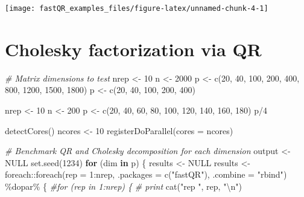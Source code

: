 \documentclass[]{tufte-handout}
\newenvironment{Shaded}{}{}
\newcommand{\AttributeTok}[1]{\textcolor[rgb]{0.49,0.56,0.16}{#1}}
\newcommand{\CommentTok}[1]{\textcolor[rgb]{0.38,0.63,0.69}{\textit{#1}}}
\newcommand{\ConstantTok}[1]{\textcolor[rgb]{0.53,0.00,0.00}{#1}}
\newcommand{\ControlFlowTok}[1]{\textcolor[rgb]{0.00,0.44,0.13}{\textbf{#1}}}
\newcommand{\DecValTok}[1]{\textcolor[rgb]{0.25,0.63,0.44}{#1}}
\newcommand{\FunctionTok}[1]{\textcolor[rgb]{0.02,0.16,0.49}{#1}}
\newcommand{\NormalTok}[1]{#1}
\newcommand{\OtherTok}[1]{\textcolor[rgb]{0.00,0.44,0.13}{#1}}
\newcommand{\SpecialCharTok}[1]{\textcolor[rgb]{0.25,0.44,0.63}{#1}}
\newcommand{\StringTok}[1]{\textcolor[rgb]{0.25,0.44,0.63}{#1}}
\begin{document}
\texttt{[image: fastQR\_examples\_files/figure-latex/unnamed-chunk-4-1]}

\hypertarget{cholesky-factorization-via-qr}{%
\section{Cholesky factorization via
QR}\label{cholesky-factorization-via-qr}}

\begin{Shaded}
\begin{Highlighting}[]
\CommentTok{\# Matrix dimensions to test}
\NormalTok{nrep }\OtherTok{\textless{}{-}} \DecValTok{10}
\NormalTok{n    }\OtherTok{\textless{}{-}} \DecValTok{2000}
\NormalTok{p    }\OtherTok{\textless{}{-}} \FunctionTok{c}\NormalTok{(}\DecValTok{20}\NormalTok{, }\DecValTok{40}\NormalTok{, }\DecValTok{100}\NormalTok{, }\DecValTok{200}\NormalTok{, }\DecValTok{400}\NormalTok{, }\DecValTok{800}\NormalTok{, }\DecValTok{1200}\NormalTok{, }\DecValTok{1500}\NormalTok{, }\DecValTok{1800}\NormalTok{)}
\NormalTok{p    }\OtherTok{\textless{}{-}} \FunctionTok{c}\NormalTok{(}\DecValTok{20}\NormalTok{, }\DecValTok{40}\NormalTok{, }\DecValTok{100}\NormalTok{, }\DecValTok{200}\NormalTok{, }\DecValTok{400}\NormalTok{)}

\NormalTok{nrep }\OtherTok{\textless{}{-}} \DecValTok{10}
\NormalTok{n    }\OtherTok{\textless{}{-}} \DecValTok{200}
\NormalTok{p    }\OtherTok{\textless{}{-}} \FunctionTok{c}\NormalTok{(}\DecValTok{20}\NormalTok{, }\DecValTok{40}\NormalTok{, }\DecValTok{60}\NormalTok{, }\DecValTok{80}\NormalTok{, }\DecValTok{100}\NormalTok{, }\DecValTok{120}\NormalTok{, }\DecValTok{140}\NormalTok{, }\DecValTok{160}\NormalTok{, }\DecValTok{180}\NormalTok{)}
\NormalTok{p}\SpecialCharTok{/}\DecValTok{4}

\FunctionTok{detectCores}\NormalTok{()}
\NormalTok{ncores }\OtherTok{\textless{}{-}} \DecValTok{10}
\FunctionTok{registerDoParallel}\NormalTok{(}\AttributeTok{cores =}\NormalTok{ ncores)}

\CommentTok{\# Benchmark QR and Cholesky decomposition for each dimension}
\NormalTok{output  }\OtherTok{\textless{}{-}} \ConstantTok{NULL}
\FunctionTok{set.seed}\NormalTok{(}\DecValTok{1234}\NormalTok{)}
\ControlFlowTok{for}\NormalTok{ (dim }\ControlFlowTok{in}\NormalTok{ p) \{}
\NormalTok{  results }\OtherTok{\textless{}{-}} \ConstantTok{NULL}
\NormalTok{  results }\OtherTok{\textless{}{-}}\NormalTok{ foreach}\SpecialCharTok{::}\FunctionTok{foreach}\NormalTok{(}\AttributeTok{rep =} \DecValTok{1}\SpecialCharTok{:}\NormalTok{nrep, }\AttributeTok{.packages =} \FunctionTok{c}\NormalTok{(}\StringTok{"fastQR"}\NormalTok{), }\AttributeTok{.combine =} \StringTok{"rbind"}\NormalTok{) }\SpecialCharTok{\%dopar\%}\NormalTok{ \{}
    \CommentTok{\#for (rep in 1:nrep) \{ }
    \CommentTok{\# print}
    \FunctionTok{cat}\NormalTok{(}\StringTok{"rep "}\NormalTok{, rep, }\StringTok{"}\SpecialCharTok{\textbackslash{}n}\StringTok{"}\NormalTok{)}
    

\end{Highlighting}
\end{Shaded}
\end{document}

